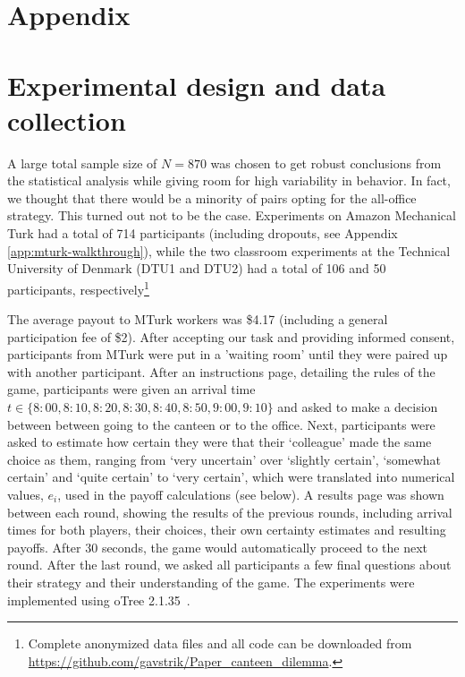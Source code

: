 \section*{\centering Appendix} 



\section{Experimental design and data collection} A large total sample size of $N=870$ was chosen to get robust conclusions from the statistical analysis while giving room for high variability in behavior. In fact, we thought that there would be a minority of pairs
opting for the all-office strategy. This turned out not to be the case. Experiments on Amazon Mechanical Turk had a total of 714 participants (including dropouts, see Appendix \ref{app:mturk-walkthrough}), while the two classroom experiments at the Technical University of Denmark (DTU1 and DTU2) had a total of 106 and 50 participants, respectively\footnote{Complete anonymized data files and all code can be downloaded from \url{https://github.com/gavstrik/Paper_canteen_dilemma}.}

The average payout to MTurk workers was \$4.17 (including a general participation fee of \$2). After accepting our task and providing informed consent, participants from MTurk were put in a ’waiting room’ until they were paired up with another participant. After an instructions page, detailing the rules of the game, participants were given an arrival time $t \in \{8{:}00, 8{:}10, 8{:}20, 8{:}30, 8{:}40, 8{:}50, 9{:}00,9{:}10\}$ and asked to make a decision between between going to the canteen or to the office. Next, participants were asked to estimate how certain they were that their `colleague' made the same choice as them, ranging from `very uncertain' over `slightly certain', `somewhat certain' and `quite certain' to `very certain', which were translated  into numerical values, $e_i$, used in the payoff calculations (see below). A results page was shown between each round, showing the results of the previous rounds, including arrival times for both players, their choices, their own certainty estimates and resulting payoffs. After 30 seconds, the game would automatically proceed to the next round. After the last round, we asked all participants a few final questions about their strategy and their understanding of the game. The experiments were implemented using oTree 2.1.35~\cite{ChenSchongerWickens16}.

